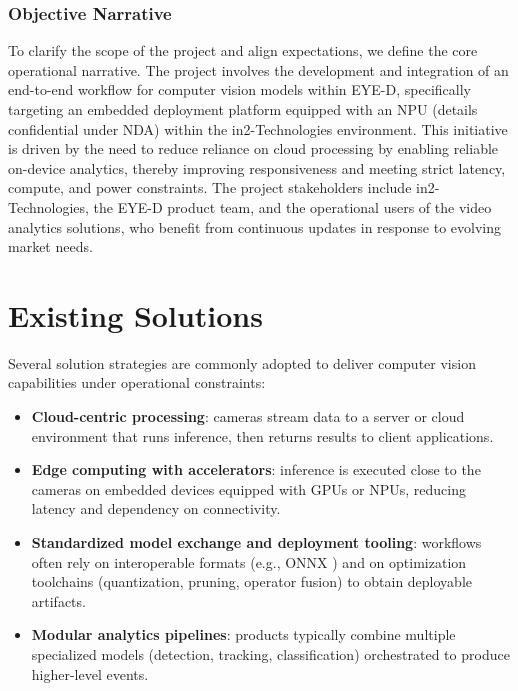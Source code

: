\subsubsection*{Objective Narrative}
To clarify the scope of the project and align expectations, we define the core operational narrative. The project involves the development and integration of an end-to-end workflow for computer vision models within EYE-D, specifically targeting an embedded deployment platform equipped with an NPU (details confidential under NDA) within the in2-Technologies environment. This initiative is driven by the need to reduce reliance on cloud processing by enabling reliable on-device analytics, thereby improving responsiveness and meeting strict latency, compute, and power constraints. The project stakeholders include in2-Technologies, the EYE-D product team, and the operational users of the video analytics solutions, who benefit from continuous updates in response to evolving market needs.




\section{Existing Solutions}
Several solution strategies are commonly adopted to deliver computer vision capabilities under operational constraints:
\begin{itemize}
  \item \textbf{Cloud-centric processing}: cameras stream data to a server or cloud environment that runs inference, then returns results to client applications.
  \item \textbf{Edge computing with accelerators}: inference is executed close to the cameras on embedded devices equipped with GPUs or NPUs, reducing latency and dependency on connectivity.
  \item \textbf{Standardized model exchange and deployment tooling}: workflows often rely on interoperable formats (e.g., ONNX \cite{ref:onnx}) and on optimization toolchains (quantization, pruning, operator fusion) to obtain deployable artifacts.
  \item \textbf{Modular analytics pipelines}: products typically combine multiple specialized models (detection, tracking, classification) orchestrated to produce higher-level events.
\end{itemize}

